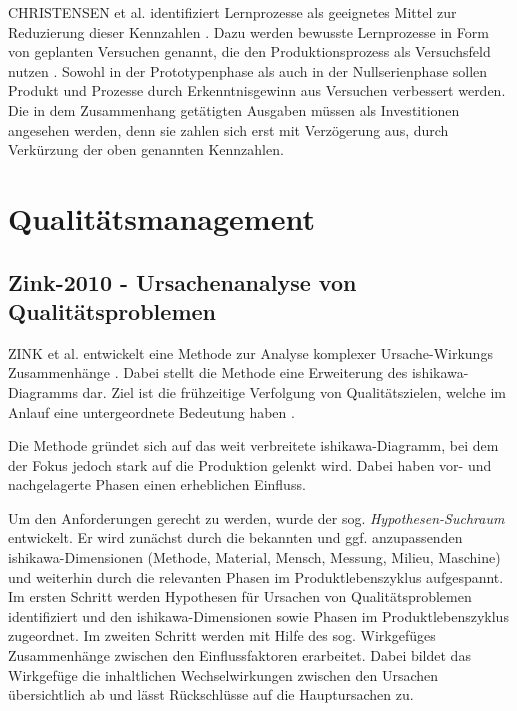 CHRISTENSEN et al. identifiziert Lernprozesse als geeignetes Mittel zur Reduzierung dieser Kennzahlen \autocite{Christensen2016}.
Dazu werden bewusste Lernprozesse in Form von geplanten Versuchen genannt, die den Produktionsprozess als Versuchsfeld nutzen \autocite{Terwiesch2001}.  Sowohl in der Prototypenphase als auch in der Nullserienphase sollen Produkt und Prozesse durch Erkenntnisgewinn aus Versuchen verbessert werden. Die in dem Zusammenhang getätigten Ausgaben müssen als Investitionen angesehen werden, denn sie zahlen sich erst mit Verzögerung aus, durch Verkürzung der oben genannten Kennzahlen. 


\section{Qualitätsmanagement}

\subsection*{Zink-2010 - Ursachenanalyse von Qualitätsproblemen}

ZINK et al. entwickelt eine Methode zur Analyse komplexer Ursache-Wirkungs Zusammenhänge \autocite{Zink2010}. Dabei stellt die Methode eine Erweiterung des \gls{ishikawa}-Diagramms dar. Ziel ist die frühzeitige Verfolgung von Qualitätszielen, welche im Anlauf eine untergeordnete Bedeutung haben \autocite{Fleischer2003, Terwiesch2001a}. 

Die Methode gründet sich auf das weit verbreitete \gls{ishikawa}-Diagramm, bei dem der Fokus jedoch stark auf die Produktion gelenkt wird. Dabei haben vor- und nachgelagerte Phasen einen erheblichen Einfluss. 

Um den Anforderungen gerecht zu werden, wurde der sog. \textit{Hypothesen-Suchraum} entwickelt. Er wird zunächst durch die bekannten und ggf. anzupassenden \gls{ishikawa}-Dimensionen (Methode, Material, Mensch, Messung, Milieu, Maschine) und weiterhin durch die relevanten Phasen im Produktlebenszyklus aufgespannt. 
Im ersten Schritt werden Hypothesen für Ursachen von Qualitätsproblemen identifiziert und den \gls{ishikawa}-Dimensionen sowie Phasen im Produktlebenszyklus zugeordnet. 
Im zweiten Schritt werden mit Hilfe des sog. Wirkgefüges Zusammenhänge zwischen den Einflussfaktoren erarbeitet. Dabei bildet das Wirkgefüge die inhaltlichen Wechselwirkungen zwischen den Ursachen übersichtlich ab und lässt Rückschlüsse auf die Hauptursachen zu. 

